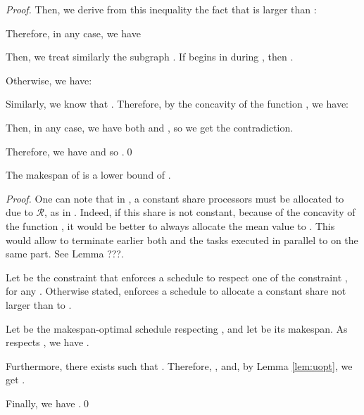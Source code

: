\documentclass{llncs}
\newcommand{\newparskip}{\bigskip}
\newcommand{\R}{\ensuremath{\mathcal{R}}\xspace}
\begin{document}
\begin{proof}
\begin{minipage}{.58\columnwidth}
 \end{minipage}
\vspace{.5em}

Then, we derive from this inequality the fact that  is larger than :


Therefore, in any case, we have 

\newparskip

Then, we treat similarly the subgraph .
If  begins in  during , then .

Otherwise, we have:



Similarly, we know that . Therefore, by the concavity of the function , we have:



Then, in any case, we have both  and , so we get the contradiction.

Therefore, we have  and so .\qed
\end{proof}


\begin{lemma}
\label{lem:slb}

The makespan of  is a lower bound of .

\end{lemma}

\begin{proof}
One can note that in , a constant share  processors must be allocated to  due to \R, as in . Indeed, if this share is not constant, because of the concavity of the function , it would be better to always allocate the mean value to . This would allow to terminate earlier both  and the tasks executed in parallel to  on the same part. {\color{red} See Lemma ???.}
 
Let  be the constraint that enforces a schedule to respect one of the constraint , for any . Otherwise stated,  enforces a schedule to allocate a constant share  not larger than  to .

Let  be the makespan-optimal schedule respecting , and let  be its makespan. As  respects , we have .

Furthermore, there exists  such that . Therefore, , and, by Lemma \ref{lem:uopt}, we get .

Finally, we have .\qed
\end{proof}
\end{document}
